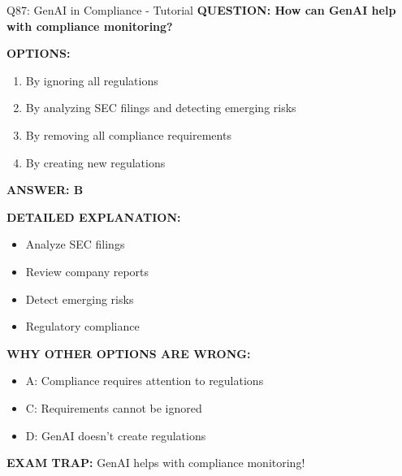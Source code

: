 \documentclass[8pt]{beamer}
\begin{document}
	\begin{frame}{Q87: GenAI in Compliance - Tutorial}
		\fontsize{6.5}{7.5}\selectfont
		\textbf{QUESTION: How can GenAI help with compliance monitoring?}
		
		\vspace{0.1cm}
		\textbf{OPTIONS:}
		\begin{enumerate}
			\item By ignoring all regulations
			\item By analyzing SEC filings and detecting emerging risks
			\item By removing all compliance requirements
			\item By creating new regulations
		\end{enumerate}
		
		\vspace{0.1cm}
		\textcolor{myblue}{\textbf{ANSWER: B}}
		
		\vspace{0.1cm}
		\textbf{DETAILED EXPLANATION:}
		\begin{itemize}
			\item Analyze SEC filings
			\item Review company reports
			\item Detect emerging risks
			\item Regulatory compliance
		\end{itemize}
		
		\vspace{0.1cm}
		\textcolor{myred}{\textbf{WHY OTHER OPTIONS ARE WRONG:}}
		\begin{itemize}
			\item \textcolor{myred}{A:} Compliance requires attention to regulations
			\item \textcolor{myred}{C:} Requirements cannot be ignored
			\item \textcolor{myred}{D:} GenAI doesn't create regulations
		\end{itemize}
		
		\textcolor{myred}{\textbf{EXAM TRAP:}} GenAI helps with \textcolor{myblue}{compliance monitoring}!
	\end{frame}
	
\end{document}
